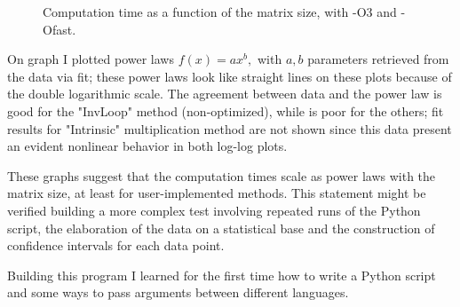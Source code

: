 \documentclass[a4paper]{article}
\begin{document}
\begin{figure}[]
\centering
{}
\caption{Computation time as a function of the matrix size, with -O3 and -Ofast.}
\label{fig:timevsize2}
\end{figure}
On graph I plotted power laws $f(x) = ax^b,$ with $a,b$ parameters retrieved from the data via fit; these power laws look like straight lines on these plots because of the double logarithmic scale.
The agreement between data and the power law is good for the "InvLoop" method (non-optimized), while is poor for the others; fit results for "Intrinsic" multiplication method are not shown since this data present an evident nonlinear behavior in both log-log plots.

\noindent These graphs suggest that the computation times scale as power laws with the matrix size, at least for user-implemented methods.
This statement might be verified building a more complex test involving repeated runs of the Python script, the elaboration of the data on a statistical base and the construction of confidence intervals for each data point.

Building this program I learned for the first time how to write a Python script and some ways to pass arguments between different languages.
\end{document}
